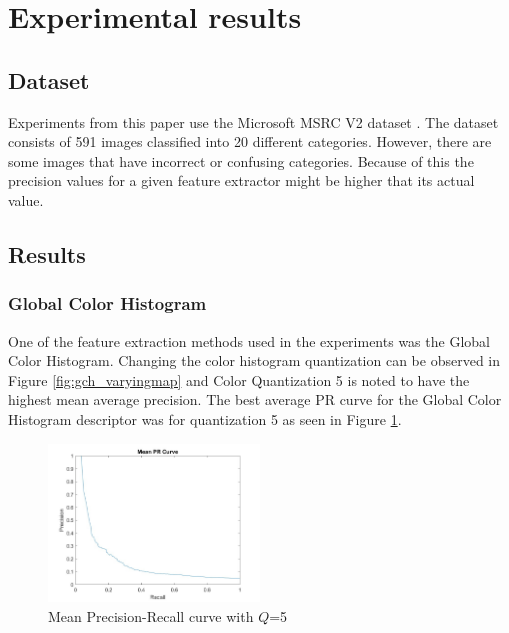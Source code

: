 \section{Experimental results}
\label{sec:experimental_results}

\subsection{Dataset}
\label{sec:dataset}

Experiments from this paper use the Microsoft MSRC V2 dataset \cite{microsoft_msrc}. The dataset consists of 591
images classified into 20 different categories. However, there are some images that have incorrect or confusing
categories. Because of this the precision values for a given feature extractor might be higher that its actual value.

\subsection{Results}
\label{sec:results}

\subsubsection{Global Color Histogram}
\label{sec:results_gch}

One of the feature extraction methods used in the experiments was the Global Color Histogram. Changing the color
histogram quantization can be observed in Figure \ref{fig:gch_varyingmap} and Color Quantization 5 is noted to have
the highest mean average precision. The best average PR curve for the Global Color Histogram descriptor was for
quantization 5 as seen in Figure \ref{fig:gch_mean_pr_graph_q5}.

\begin{figure}[htbp]
  \begin{center}
    \includegraphics[width=0.5\textwidth]{./assets/plots/Global_Color_Histogram/mean_pr_graph_q4.jpg}
    \caption{Mean Precision-Recall curve with $Q$=5}
    \label{fig:gch_mean_pr_graph_q5}
  \end{center}
\end{figure}

